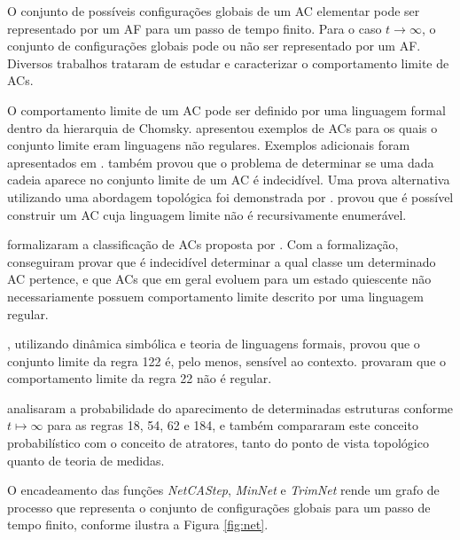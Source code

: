 \documentclass[12pt,a4paper]{article}
\begin{document}
O conjunto de possíveis configurações globais de um AC elementar pode ser
representado por um AF para um passo de tempo finito. Para
o caso $t \rightarrow \infty$, o conjunto de configurações globais pode ou
não ser representado por um AF. Diversos trabalhos trataram de estudar e
caracterizar o comportamento limite de ACs.

O comportamento limite de um AC pode ser definido por uma linguagem
formal dentro da hierarquia de Chomsky.  apresentou
exemplos de ACs para os quais o conjunto limite eram linguagens não
regulares. Exemplos adicionais foram apresentados em .
também provou que o problema de determinar se uma
dada cadeia aparece no conjunto limite de um AC é indecidível.
Uma prova alternativa utilizando uma abordagem topológica foi demonstrada
por .   provou que é possível
construir um AC cuja linguagem limite não é recursivamente enumerável.

 formalizaram a classificação de ACs proposta por
. Com a formalização, conseguiram provar que é
indecidível determinar a qual classe um determinado AC pertence, e que
ACs que em geral evoluem para um estado quiescente não necessariamente possuem
comportamento limite descrito por uma linguagem regular.

, utilizando dinâmica simbólica e teoria de
linguagens formais, provou que o conjunto limite da regra 122 é,
pelo menos, sensível ao contexto.  provaram que
o comportamento limite da regra 22 não é regular.

 analisaram a probabilidade do aparecimento de
determinadas estruturas conforme $t \mapsto \infty$ para as regras
18, 54, 62 e 184, e também compararam este conceito probabilístico
com o conceito de atratores, tanto do ponto de vista topológico
quanto de teoria de medidas.

O encadeamento das funções \emph{NetCAStep}, \emph{MinNet}
e \emph{TrimNet} rende um grafo de processo que representa o conjunto de
configurações globais para um passo de tempo finito, conforme ilustra
a Figura \ref{fig:net}.
\end{document}

